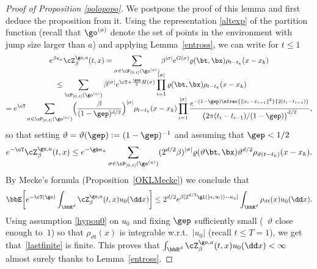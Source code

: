 \begin{proof}[Proof of Proposition \ref{polopopo}]
We postpone the proof of this lemma and first deduce the proposition from it.
Using the representation \eqref{altexp} of the partition function (recall that $\go^{(a)}$ denote the set of points in the environment with jump size larger than $a$)
and applying Lemma~\ref{entross},
we can write for $t\le 1$
\begin{multline*}
e^{\beta \kappa_a}\cZ^{\go,a}_{\beta}(t,x)=\sum_{\sigma\in \cP_{[0,t]}(\go^{(a)})}\beta^{|\sigma|} e^{G(\sigma)} \varrho(\bt,\bx)\rho_{t-t_k}(x-x_k)\\[-8pt]
\hspace*{-7mm}\le \sum_{\cP_{[0,t]}(\go^{(a)})}\beta^{|\sigma|} e^{\cT+ \frac \gep 2 H(\sigma)} \prod_{i=1}^{|\sigma|} \varrho(\bt,\bx)\rho_{t-t_k}(x-x_k)\\[-8pt]
= e^{\cT} \sum_{\sigma\in \cP_{[0,t]}(\go^{(a)})} \Bigl(\frac{\beta}{(1-\gep)^{d/2}} \Bigr)^{|\sigma|} \rho_{t-t_k}(x-x_k) \prod_{i=1}^{ |\sigma|} \frac{e^{- (1-\gep)\sfrac{\|x_i-x_{i-1} \|^2}{2\left(t_i-t_{i-1}\right)}}}{ \bigl(2\pi (t_i-t_{i-1}) /(1-\gep)\bigr)^{d/2}},
\end{multline*}
so that setting $\vartheta =\vartheta(\gep): = (1-\gep)^{-1}$ and assuming that $\gep<1/2$
\begin{equation}
e^{-\cT} \cZ^{\go,a}_{\beta}(t,x) \leq e^{ -\gb \kappa_a} \sum_{\sigma\in \cP_{[0,t]}(\go^{(a)})}(2^{d/2}\beta)^{|\sigma|} \varrho(\vartheta \bt,\bx) \vartheta^{d/2} \rho_{ \vartheta (t-t_k)}(x-x_k).
\end{equation}
By Mecke's formula (Proposition~\ref{OKLMecke}) we conclude
that
\begin{equation}
\label{lastfinite}
\bbE\biggl[e^{-\cT(\go)}\int_{\bbR^d} \cZ^{\go, a}_{\beta}(t,x) u_0(\dd x)\biggr]\le 2^{d/2} e^{\beta [ 2^{d/2} \gl([a,\infty))-\kappa_a ]}\int_{\bbR^d } \rho_{ \vartheta t}(x) u_0(\dd x).
\end{equation}
Using assumption \eqref{hypou0} on $u_0$ and
fixing $\gep$ sufficiently small (\ie \ $\vartheta$ close enough to~$1$) so that $\rho_{ \vartheta t}(x)$
is integrable w.r.t.\ $|u_0|$ (recall $t\leq T =1$),
we get that~\eqref{lastfinite} is finite.
This proves that $\int_{\bbR^d} \cZ^{\go,a}_{\beta}(t,x)u_0(\dd x)<\infty$ almost surely thanks to Lemma~\ref{entross}.
\end{proof}

